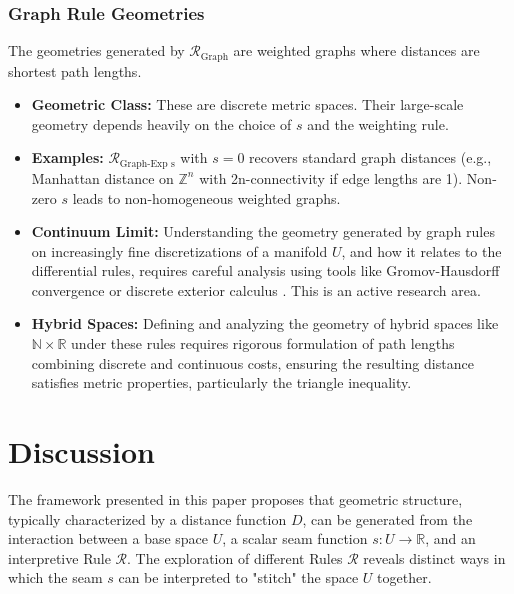 \documentclass[twoside,twocolumn]{article}
\begin{document}
\subsubsection{Graph Rule Geometries}
The geometries generated by \( \mathcal{R}_{\text{Graph}} \) are weighted graphs where distances are shortest path lengths.
\begin{itemize}
    \item \textbf{Geometric Class:} These are discrete metric spaces. Their large-scale geometry depends heavily on the choice of \( s \) and the weighting rule.
    \item \textbf{Examples:} \( \mathcal{R}_{\text{Graph-Exp s}} \) with \( s=0 \) recovers standard graph distances (e.g., Manhattan distance on \( \mathbb{Z}^n \) with 2n-connectivity if edge lengths are 1). Non-zero \( s \) leads to non-homogeneous weighted graphs.
    \item \textbf{Continuum Limit:} Understanding the geometry generated by graph rules on increasingly fine discretizations of a manifold \( U \), and how it relates to the differential rules, requires careful analysis using tools like Gromov-Hausdorff convergence or discrete exterior calculus \cite{Ollivier2009,BobenkoSpringborn2007}. %
    This is an active research area.
    \item \textbf{Hybrid Spaces:} Defining and analyzing the geometry of hybrid spaces like \( \mathbb{N} \times \mathbb{R} \) under these rules requires rigorous formulation of path lengths combining discrete and continuous costs, ensuring the resulting distance satisfies metric properties, particularly the triangle inequality.
\end{itemize}


\setcounter{equation}{0} %
\section{Discussion}

The framework presented in this paper proposes that geometric structure, typically characterized by a distance function $D$, can be generated from the interaction between a base space $U$, a scalar seam function $s: U \to \mathbb{R}$, and an interpretive Rule $\mathcal{R}$. The exploration of different Rules $\mathcal{R}$ reveals distinct ways in which the seam $s$ can be interpreted to "stitch" the space $U$ together.
\end{document}
